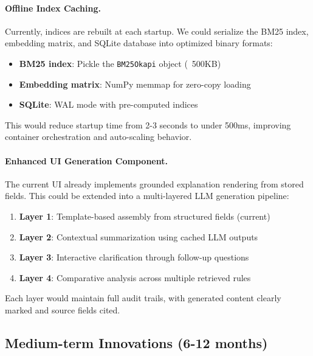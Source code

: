 \paragraph{Offline Index Caching.} Currently, indices are rebuilt at each startup. We could serialize the BM25 index, embedding matrix, and SQLite database into optimized binary formats:
\begin{itemize}[leftmargin=*,itemsep=2pt,topsep=2pt]
 \item \textbf{BM25 index}: Pickle the \texttt{BM25Okapi} object (~500KB)
 \item \textbf{Embedding matrix}: NumPy memmap for zero-copy loading
 \item \textbf{SQLite}: WAL mode with pre-computed indices
\end{itemize}
This would reduce startup time from 2-3 seconds to under 500ms, improving container orchestration and auto-scaling behavior.

\paragraph{Enhanced UI Generation Component.} The current UI already implements grounded explanation rendering from stored fields. This could be extended into a multi-layered LLM generation pipeline:
\begin{enumerate}[leftmargin=*,itemsep=2pt,topsep=2pt]
 \item \textbf{Layer 1}: Template-based assembly from structured fields (current)
 \item \textbf{Layer 2}: Contextual summarization using cached LLM outputs
 \item \textbf{Layer 3}: Interactive clarification through follow-up questions
 \item \textbf{Layer 4}: Comparative analysis across multiple retrieved rules
\end{enumerate}
Each layer would maintain full audit trails, with generated content clearly marked and source fields cited.

\subsection{Medium-term Innovations (6-12 months)}

